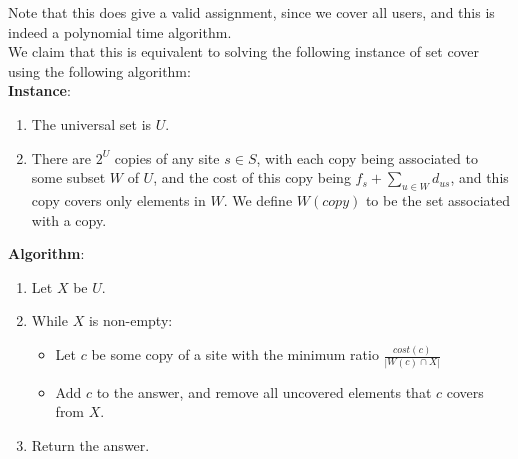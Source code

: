 \documentclass[a4paper]{article}
\newcommand{\nl}{\vspace{0.2cm}\\}
\begin{document}
Note that this does give a valid assignment, since we cover all users, and this is indeed a polynomial time algorithm.\nl

We claim that this is equivalent to solving the following instance of set cover using the following algorithm:\nl
\textbf{Instance}:
\begin{enumerate}
    \item The universal set is $U$.
    \item There are $2^{U}$ copies of any site $s \in S$, with each copy being associated to some subset $W$ of $U$, and the cost of this copy being $f_s + \sum_{u \in W} d_{u{s}}$, and
        this copy covers only elements in $W$. We define $W(copy)$ to be the set associated with a copy.
\end{enumerate}
\textbf{Algorithm}:
\begin{enumerate}
    \item Let $X$ be $U$.
    \item While $X$ is non-empty:
        \begin{itemize}
            \item Let $c$ be some copy of a site with the minimum ratio $\frac{cost(c)}{|W(c) \cap X|}$
            \item Add $c$ to the answer, and remove all uncovered elements that $c$ covers from $X$.
        \end{itemize}
    \item Return the answer.
\end{enumerate}
\end{document}
